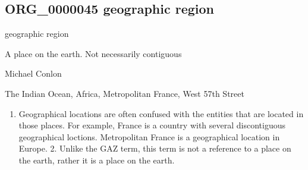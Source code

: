 \documentclass[letterpaper,10pt,english]{sphinxmanual}
\begin{document}
\subsection{ORG\_0000045 \sphinxhyphen{} geographic region}
\label{\detokenize{doc-ORG_0000045:org-0000045-geographic-region}}\label{\detokenize{doc-ORG_0000045:index-0}}\label{\detokenize{doc-ORG_0000045::doc}}
\begin{sphinxShadowBox}

\sphinxAtStartPar
geographic region
\end{sphinxShadowBox}

\begin{sphinxShadowBox}

\sphinxAtStartPar
{\hyperref[\detokenize{doc-BFO_0000029::doc}]{}}
\end{sphinxShadowBox}

\begin{sphinxShadowBox}

\sphinxAtStartPar
A place on the earth.  Not necessarily contiguous
\end{sphinxShadowBox}

\begin{sphinxShadowBox}

\sphinxAtStartPar
Michael Conlon 
\end{sphinxShadowBox}

\begin{sphinxShadowBox}

\sphinxAtStartPar
The Indian Ocean, Africa, Metropolitan France, West 57th Street
\end{sphinxShadowBox}

\begin{sphinxShadowBox}
\begin{enumerate}
%
\item {} 
\sphinxAtStartPar
Geographical locations are often confused with the entities that are located in those places.  For example, France is a country with several discontiguous geographical loctions.  Metropolitan France is a geographical location in Europe.  2. Unlike the GAZ term, this term is not a reference to a place on the earth, rather it is a place on the earth.

\end{enumerate}
\end{sphinxShadowBox}
\end{document}
